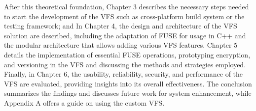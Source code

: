 After this theoretical foundation, Chapter 3 describes the necessary steps needed to start the development of the VFS such as cross-platform build system or the testing framework;
and In Chapter 4, the design and architecture of the VFS solution are described, including the adaptation of FUSE for usage in C++ and the modular architecture that allows adding various VFS features.
Chapter 5 details the implementation of essential FUSE operations, prototyping encryption, and versioning in the VFS and discussing the methods and strategies employed.
Finally, in Chapter 6, the usability, reliability, security, and performance of the VFS are evaluated, providing insights into its overall effectiveness.
The conclusion summarizes the findings and discusses future work for system enhancement, while Appendix A offers a guide on using the custom VFS.